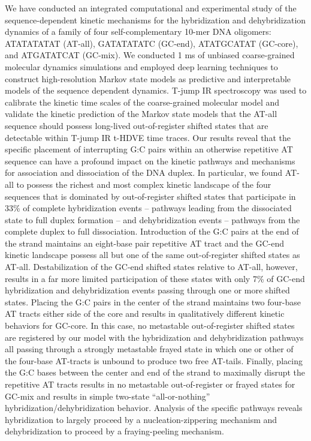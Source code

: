 \documentclass[journal=jpcbfk,manuscript=article]{achemso}
\newcommand*{\rood}[1]{{\color{red}{#1}}}
\begin{document}
We have conducted an integrated computational and experimental study of the sequence-dependent kinetic mechanisms for the hybridization and dehybridization dynamics of a family of four self-complementary 10-mer DNA oligomers: ATATATATAT (AT-all), GATATATATC (GC-end), ATATGCATAT (GC-core), and ATGATATCAT (GC-mix). We conducted 1 ms of unbiased coarse-grained molecular dynamics simulations \rood{at the melting temperature of each sequence} and employed deep learning techniques to construct high-resolution Markov state models as predictive and interpretable models of the sequence dependent dynamics. T-jump IR spectroscopy was used to calibrate the kinetic time scales of the coarse-grained molecular model and validate the kinetic prediction of the Markov state models that the AT-all sequence should possess long-lived out-of-register shifted states that are detectable within T-jump IR t-HDVE time traces. Our results reveal that the specific placement of interrupting G:C pairs within an otherwise repetitive AT sequence can have a profound impact on the kinetic pathways and mechanisms for association and dissociation of the DNA duplex. In particular, we found AT-all to possess the richest and most complex kinetic landscape of the four sequences that is dominated by out-of-register shifted states that participate in 33\% of complete hybridization events -- pathways leading from the dissociated state to full duplex formation -- and dehybridization events -- pathways from the complete duplex to full dissociation. Introduction of the G:C pairs at the end of the strand maintains an eight-base pair repetitive AT tract and the GC-end kinetic landscape possess all but one of the same out-of-register shifted states as AT-all. Destabilization of the GC-end shifted states relative to AT-all, however, results in a far more limited participation of these states with only 7\% of GC-end hybridization and dehybridization events passing through one or more shifted states. Placing the G:C pairs in the center of the strand maintains two four-base AT tracts either side of the core and results in qualitatively different kinetic behaviors for GC-core. In this case, no metastable out-of-register shifted states are registered by our model with the hybridization and dehybridization pathways all passing through a strongly metastable frayed state in which one or other of the four-base AT-tracts is unbound to produce two free AT-tails. Finally, placing the G:C bases between the center and end of the strand to maximally disrupt the repetitive AT tracts results in no metastable out-of-register or frayed states for GC-mix and results in simple two-state ``all-or-nothing'' hybridization/dehybridization behavior. Analysis of the specific pathways reveals hybridization to largely proceed by a nucleation-zippering mechanism and dehybridization to proceed by a fraying-peeling mechanism. 
\end{document}
